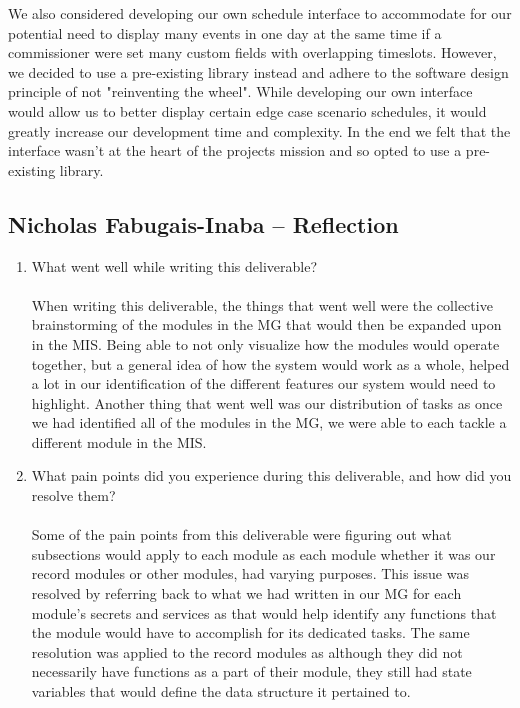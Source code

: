 \documentclass[12pt, titlepage]{article}
\begin{document}
\begin{enumerate}
    We also considered developing our own schedule interface to accommodate for our
    potential need to display many events in one day at the same time if a
    commissioner were set many custom fields with overlapping timeslots. However, we
    decided to use a pre-existing library instead and adhere to the software design
    principle of not "reinventing the wheel". While developing our own interface
    would allow us to better display certain edge case scenario schedules, it would 
    greatly increase our development time and complexity. In the end we felt that
    the interface wasn't at the heart of the projects mission and so opted to use a 
    pre-existing library.

\end{enumerate}

\subsection*{Nicholas Fabugais-Inaba -- Reflection}

\begin{enumerate}
  \item What went well while writing this deliverable?\\\\
  When writing this deliverable, the things that went well were the collective brainstorming
  of the modules in the MG that would then be expanded upon in the MIS. Being able to not only
  visualize how the modules would operate together, but a general idea of how the system would
  work as a whole, helped a lot in our identification of the different features our system would
  need to highlight. Another thing that went well was our distribution of tasks as once we had
  identified all of the modules in the MG, we were able to each tackle a different module in the
  MIS.
  \item What pain points did you experience during this deliverable, and how
  did you resolve them?\\\\
  Some of the pain points from this deliverable were figuring out what subsections would apply to
  each module as each module whether it was our record modules or other modules, had varying
  purposes. This issue was resolved by referring back to what we had written in our MG for each
  module's secrets and services as that would help identify any functions that the module would
  have to accomplish for its dedicated tasks. The same resolution was applied to the record
  modules as although they did not necessarily have functions as a part of their module, they still
  had state variables that would define the data structure it pertained to.
\end{enumerate}
\end{document}
